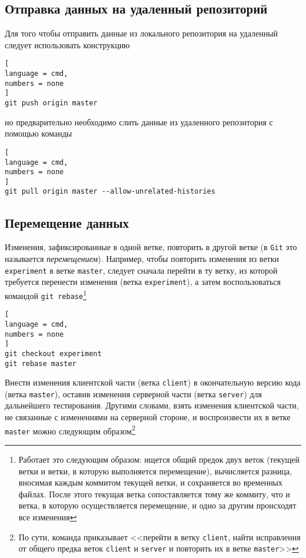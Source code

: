 \documentclass[%
	11pt,
	a4paper,
	utf8,
		]{article}
\begin{document}
\subsection{Отправка данных на удаленный репозиторий}

Для того чтобы отправить данные из локального репозитория на удаленный следует использовать конструкцию

\begin{lstlisting}[
language = cmd,
numbers = none
]
git push origin master
\end{lstlisting}

\noindent но предварительно необходимо слить данные из удаленного репозитория с помощью команды

\begin{lstlisting}[
language = cmd,
numbers = none
]
git pull origin master --allow-unrelated-histories
\end{lstlisting}


\subsection{Перемещение данных}

Изменения, зафиксированные в одной ветке, повторить в другой ветке (в \texttt{Git} это называется \emph{перемещением}). Например, чтобы повторить изменения из ветки \texttt{experiment} в ветке \texttt{master}, следует сначала перейти в ту ветку, из которой требуется перенести изменения (ветка \texttt{experiment}), а затем воспользоваться командой \texttt{git rebase}\footnote{Работает это следующим образом: ищется общий предок двух веток (текущей ветки и ветки, в которую выполняется перемещение), вычисляется разница, вносимая каждым коммитом текущей ветки, и сохраняется во временных файлах. После этого текущая ветка сопоставляется тому же коммиту, что и ветка, в которую осуществляется перемещение, и одно за другим происходят все изменения}

\begin{lstlisting}[
language = cmd,
numbers = none
]
git checkout experiment
git rebase master
\end{lstlisting}


Внести изменения клиентской части (ветка \texttt{client}) в окончательную версию кода (ветка \texttt{master}), оставив изменения серверной части (ветка \texttt{server}) для дальнейшего тестирования. Другими словами, взять изменения клиентской части, не связанные с изменениями на серверной стороне, и воспроизвести их в ветке \texttt{master} можно следующим образом\footnote{По сути, команда приказывает <<перейти в ветку \texttt{client}, найти исправления от общего предка веток \texttt{client} и \texttt{server} и повторить их в ветке \texttt{master}>>}
\end{document}
